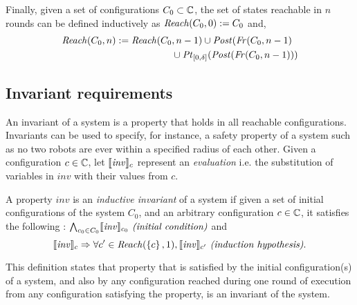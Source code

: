 Finally, given a set of configurations $C_0\subset\mathbb{C}$, the set of states reachable in $n$ rounds can be defined inductively as $\mathit{Reach}(C_0,0) := C_0$ and,
\begin{align*}
\mathit{Reach}(C_0,n) := \mathit{Reach}(C_0 &,n-1) \cup \mathit{Post}(\mathit{Fr}(C_0,n-1) \\ &\cup \mathit{Pt}_{[0,\delta]}(\mathit{Post}(\mathit{Fr}(C_0,n-1)))
\end{align*}



\subsection{Invariant requirements}
An invariant of a system is a property that holds in all reachable configurations. Invariants can be used to specify, for instance, a safety property of a system such as no two robots are ever within a specified radius of each other. 
Given a configuration $c \in \mathbb{C}$, let $\llbracket\mathit{inv}\rrbracket_{c}$ represent an \emph{evaluation} i.e. the substitution of variables in $\mathit{inv}$ with their values from $c$.

\begin{definition}
\label{def:ii}
A property $\mathit{inv}$ is an \emph{inductive invariant} of a system if given a set of initial configurations of the system $C_0$, and an arbitrary configuration $c\in \mathbb{C}$, it satisfies the following :
$\bigwedge_{c_0\in C_0} \llbracket\mathit{inv}\rrbracket_{c_0}\mbox{\textit{ (initial condition)}}$ and
$$\llbracket\mathit{inv}\rrbracket_{c} \Rightarrow \forall c' \in \mathit{Reach}(\left\{c\right\},1), \llbracket\mathit{inv}\rrbracket_{c'} \mbox{\textit{ (induction hypothesis)}}.$$
\end{definition}
This definition states that property that is satisfied by the initial configuration(s) of a system, and also by any configuration reached during one round of execution from any configuration satisfying the property, is an invariant of the system.



